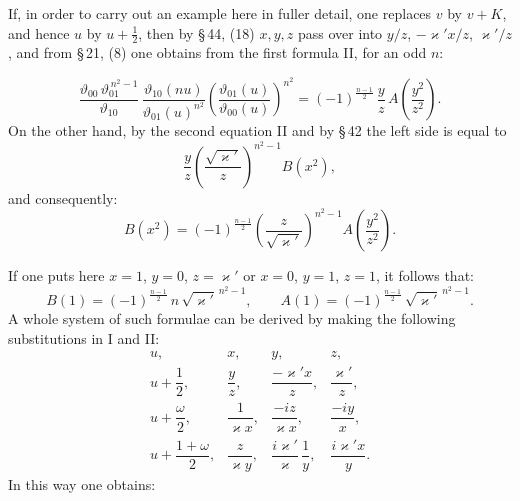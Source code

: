 If, in order to carry out an example here in fuller detail, one replaces
$v$ by $v + K$, and hence $u$ by $u + \frac{1}{2}$, then by
\S\,44, (18) $x, y, z$ pass over into $y/z$, $-\varkappa' x/z$, $\varkappa'/z$, and from
\S\,21, (8) one obtains from the first formula II, for an odd $n$:

\[
\frac{\vartheta_{00}\,\vartheta_{01}^{\,n^2-1}}{\vartheta_{10}}\,
\frac{\vartheta_{10}(nu)}{\vartheta_{01}(u)^{n^2}}
\left(\frac{\vartheta_{01}(u)}{\vartheta_{00}(u)}\right)^{n^2}
= (-1)^{\frac{n-1}{2}}\,\frac{y}{z}\,A\!\left(\frac{y^2}{z^2}\right).
\]
On the other hand, by the second equation II and by \S\,42 the left
side is equal to
\[
\frac{y}{z}\left(\frac{\sqrt{\varkappa'}}{z}\right)^{n^2-1} B(x^2),
\]
and consequently:
\[
B(x^2) = (-1)^{\frac{n-1}{2}}\left(\frac{z}{\sqrt{\varkappa'}}\right)^{n^2-1} A\!\left(\frac{y^2}{z^2}\right).
\]

If one puts here $x = 1$, $y = 0$, $z = \varkappa'$ or $x = 0$, $y = 1$,
$z = 1$, it follows that:
\[
B(1) = (-1)^{\frac{n-1}{2}}\, n\, \sqrt{\varkappa'}^{\,n^2-1}, \qquad
A(1) = (-1)^{\frac{n-1}{2}}\, \sqrt{\varkappa'}^{\,n^2-1}.
\]
A whole system of such formulae can be derived by making the
following substitutions in I and II:
\[
\begin{array}{cccc}
u, & x, & y, & z, \\[6pt]
u+\dfrac{1}{2}, & \dfrac{y}{z}, & \dfrac{-\varkappa' x}{z}, & \dfrac{\varkappa'}{z}, \\[10pt]
u+\dfrac{\omega}{2}, & \dfrac{1}{\varkappa x}, & \dfrac{-iz}{\varkappa x}, & \dfrac{-iy}{x}, \\[10pt]
u+\dfrac{1+\omega}{2}, & \dfrac{z}{\varkappa y}, & \dfrac{i\varkappa'}{\varkappa}\,\dfrac{1}{y}, & \dfrac{i\varkappa' x}{y}.
\end{array}
\]
In this way one obtains:
